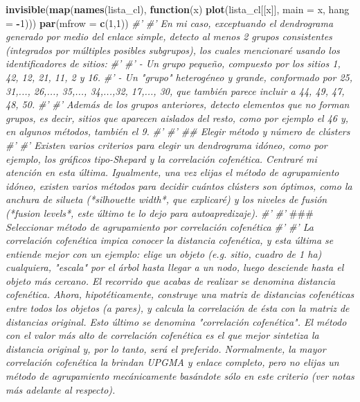 \documentclass[11pt,]{article}
\newenvironment{Shaded}{\begin{snugshade}}{\end{snugshade}}
\newcommand{\KeywordTok}[1]{\textcolor[rgb]{0.13,0.29,0.53}{\textbf{#1}}}
\newcommand{\DataTypeTok}[1]{\textcolor[rgb]{0.13,0.29,0.53}{#1}}
\newcommand{\DecValTok}[1]{\textcolor[rgb]{0.00,0.00,0.81}{#1}}
\newcommand{\CommentTok}[1]{\textcolor[rgb]{0.56,0.35,0.01}{\textit{#1}}}
\newcommand{\ControlFlowTok}[1]{\textcolor[rgb]{0.13,0.29,0.53}{\textbf{#1}}}
\newcommand{\OperatorTok}[1]{\textcolor[rgb]{0.81,0.36,0.00}{\textbf{#1}}}
\newcommand{\AlertTok}[1]{\textcolor[rgb]{0.94,0.16,0.16}{#1}}
\newcommand{\NormalTok}[1]{#1}
\begin{document}
\begin{Shaded}
\begin{Highlighting}[]
{{{\KeywordTok{invisible}\NormalTok{(}\KeywordTok{map}\NormalTok{(}\KeywordTok{names}\NormalTok{(lista_cl), }\ControlFlowTok{function}\NormalTok{(x) }\KeywordTok{plot}\NormalTok{(lista_cl[[x]], }\DataTypeTok{main =}\NormalTok{ x, }\DataTypeTok{hang =} \OperatorTok{-}\DecValTok{1}\NormalTok{)))}
\KeywordTok{par}\NormalTok{(}\DataTypeTok{mfrow =} \KeywordTok{c}\NormalTok{(}\DecValTok{1}\NormalTok{,}\DecValTok{1}\NormalTok{))}
\CommentTok{#' }
\CommentTok{#' En mi caso, exceptuando el dendrograma generado por medio del enlace simple, detecto al menos 2 grupos consistentes (integrados por múltiples posibles subgrupos), los cuales mencionaré usando los identificadores de sitios:}
\CommentTok{#' }
\CommentTok{#' - Un grupo pequeño, compuesto por los sitios 1, 42, 12, 21, 11, 2 y 16.}
\CommentTok{#' - Un "grupo" heterogéneo y grande, conformado por 25, 31,..., 26,..., 35,..., 34,...,32, 17,..., 30, que también parece incluir a 44, 49, 47, 48, 50.}
\CommentTok{#' }
\CommentTok{#' Además de los grupos anteriores, detecto elementos que no forman grupos, es decir, sitios que aparecen aislados del resto, como por ejemplo el 46 y, en algunos métodos, también el 9.}
\CommentTok{#' }
\CommentTok{#' ## Elegir método y número de clústers}
\CommentTok{#' }
\CommentTok{#' Existen varios criterios para elegir un dendrograma idóneo, como por ejemplo, los gráficos tipo-Shepard y la correlación cofenética. Centraré mi atención en esta última. Igualmente, una vez elijas el método de agrupamiento idóneo, existen varios métodos para decidir cuántos clústers son óptimos, como la anchura de silueta (*silhouette width*, que explicaré) y los niveles de fusión (*fusion levels*, este último te lo dejo para autoapredizaje).}
\CommentTok{#' }
\CommentTok{#' }\AlertTok{###}\CommentTok{ Seleccionar método de agrupamiento por correlación cofenética}
\CommentTok{#' }
\CommentTok{#' La correlación cofenética impica conocer la distancia cofenética, y esta última se entiende mejor con un ejemplo: elige un objeto (e.g. sitio, cuadro de 1 ha) cualquiera, "escala" por el árbol hasta llegar a un nodo, luego desciende hasta el objeto más cercano. El recorrido que acabas de realizar se denomina distancia cofenética. Ahora, hipotéticamente, construye una matriz de distancias cofenéticas entre todos los objetos (a pares), y calcula la correlación de ésta con la matriz de distancias original. Esto último se denomina "correlación cofenética". El método con el valor más alto de correlación cofenética es el que mejor sintetiza la distancia original y, por lo tanto, será el preferido. Normalmente, la mayor correlación cofenética la brindan UPGMA y enlace completo, pero no elijas un método de agrupamiento mecánicamente basándote sólo en este criterio (ver notas más adelante al respecto).}
}}}
\end{Highlighting}
\end{Shaded}
\end{document}
